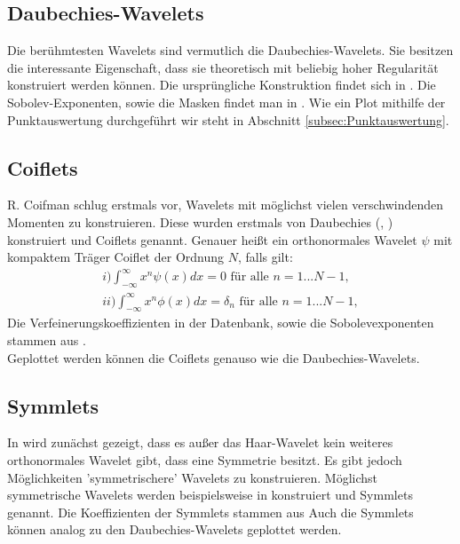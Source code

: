 \documentclass[11pt,a4paper,titlepage]{article}
\theoremstyle{plain} %
\theoremstyle{definition} %
\numberwithin{equation}{section} %
\begin{document}
		\subsection{Daubechies-Wavelets}
		Die berühmtesten Wavelets sind vermutlich die Daubechies-Wavelets. Sie besitzen die interessante Eigenschaft, dass sie theoretisch mit beliebig hoher Regularität konstruiert werden können. Die ursprüngliche Konstruktion findet sich in \cite{Daubechies1988}. Die Sobolev-Exponenten, sowie die Masken findet man in \cite{Daubechies1992}. Wie ein Plot mithilfe der Punktauswertung durchgeführt wir steht in Abschnitt \ref{subsec:Punktauswertung}. \\
		
		\subsection{Coiflets}
		R. Coifman schlug erstmals vor, Wavelets mit möglichst vielen verschwindenden Momenten zu konstruieren. Diese wurden erstmals von Daubechies (\cite{Daubechies1993}, \cite{Daubechies1992}) konstruiert und Coiflets genannt. Genauer heißt ein orthonormales Wavelet $\psi$ mit kompaktem Träger Coiflet der Ordnung $N$, falls gilt:
		\begin{align}
				i) \int_{-\infty}^{\infty}x^n \psi(x) dx = 0 \text{ für alle } n=1...N-1,\\
				ii) \int_{-\infty}^{\infty}x^n \phi(x) dx = \delta_n \text{ für alle } n=1...N-1,
		\end{align} 
		Die Verfeinerungskoeffizienten in der Datenbank, sowie die Sobolevexponenten stammen aus \cite{CernaFinekNajzar2008}.\\
		Geplottet werden können die Coiflets genauso wie die Daubechies-Wavelets.\\
		
		\subsection{Symmlets}
		In \cite{Daubechies1993} wird zunächst gezeigt, dass es außer das Haar-Wavelet kein weiteres orthonormales Wavelet gibt, dass eine Symmetrie besitzt. Es gibt jedoch Möglichkeiten 'symmetrischere' Wavelets zu konstruieren. Möglichst symmetrische Wavelets werden beispielsweise in \cite{Daubechies1992} konstruiert und Symmlets genannt.
		Die Koeffizienten der Symmlets stammen aus \cite{Daubechies1992} Auch die Symmlets können analog zu den Daubechies-Wavelets geplottet werden.\\
		
\end{document}
